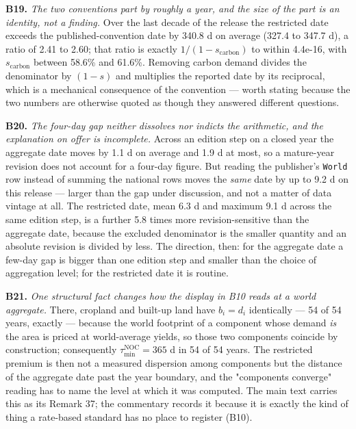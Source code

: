\documentclass[11pt]{article}
\begin{document}
\textbf{B19.} \emph{The two conventions part by roughly a year, and the size of the part is an identity, not a finding.} Over the last decade of the release the restricted date exceeds the published-convention date by 340.8 d on average (327.4 to 347.7 d), a ratio of 2.41 to 2.60; that ratio is exactly \(1/(1-s_{\mathrm{carbon}})\) to within 4.4e-16, with \(s_{\mathrm{carbon}}\) between 58.6\% and 61.6\%. Removing carbon demand divides the denominator by \((1-s)\) and multiplies the reported date by its reciprocal, which is a mechanical consequence of the convention --- worth stating because the two numbers are otherwise quoted as though they answered different questions.

\textbf{B20.} \emph{The four-day gap neither dissolves nor indicts the arithmetic, and the explanation on offer is incomplete.} Across an edition step on a closed year the aggregate date moves by 1.1 d on average and 1.9 d at most, so a mature-year revision does not account for a four-day figure. But reading the publisher's \texttt{World} row instead of summing the national rows moves the \emph{same} date by up to 9.2 d on this release --- larger than the gap under discussion, and not a matter of data vintage at all. The restricted date, mean 6.3 d and maximum 9.1 d across the same edition step, is a further 5.8 times more revision-sensitive than the aggregate date, because the excluded denominator is the smaller quantity and an absolute revision is divided by less. The direction, then: for the aggregate date a few-day gap is bigger than one edition step and smaller than the choice of aggregation level; for the restricted date it is routine.

\textbf{B21.} \emph{One structural fact changes how the display in B10 reads at a world aggregate.} There, cropland and built-up land have \(b_i = d_i\) identically --- 54 of 54 years, exactly --- because the world footprint of a component whose demand \emph{is} the area is priced at world-average yields, so those two components coincide by construction; consequently \(\tau_{\min}^{\mathrm{NOC}} = 365\) d in 54 of 54 years. The restricted premium is then not a measured dispersion among components but the distance of the aggregate date past the year boundary, and the "components converge" reading has to name the level at which it was computed. The main text carries this as its Remark 37; the commentary records it because it is exactly the kind of thing a rate-based standard has no place to register (B10).

\vspace{0.8em}
\end{document}
